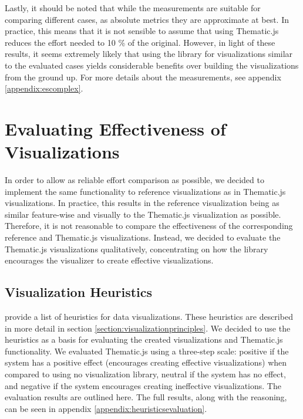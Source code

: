 Lastly, it should be noted that while the measurements are suitable for comparing different cases, as absolute metrics they are approximate at best. In practice, this means that it is not sensible to assume that using Thematic.js reduces the effort needed to 10 \% of the original. However, in light of these results, it seems extremely likely that using the library for visualizations similar to the evaluated cases yields considerable benefits over building the visualizations from the ground up. For more details about the measurements, see appendix \ref{appendix:escomplex}.


\section{Evaluating Effectiveness of Visualizations}
\label{section:evaluatingeffectiveness}

In order to allow as reliable effort comparison as possible, we decided to implement the same functionality to reference visualizations as in Thematic.js visualizations. In practice, this results in the reference visualization being as similar feature-wise and visually to the Thematic.js visualization as possible. Therefore, it is not reasonable to compare the effectiveness of the corresponding reference and Thematic.js visualizations. Instead, we decided to evaluate the Thematic.js visualizations qualitatively, concentrating on how the library encourages the visualizer to create effective visualizations.

\subsection{Visualization Heuristics}

\citet{zuk_heuristics_2006} provide a list of heuristics for data visualizations. These heuristics are described in more detail in section \ref{section:visualizationprinciples}. We decided to use the heuristics as a basis for evaluating the created visualizations and Thematic.js functionality. We evaluated Thematic.js using a three-step scale: positive if the system has a positive effect (encourages creating effective visualizations) when compared to using no visualization library, neutral if the system has no effect, and negative if the system encourages creating ineffective visualizations. The evaluation results are outlined here. The full results, along with the reasoning, can be seen in appendix \ref{appendix:heuristicsevaluation}.

